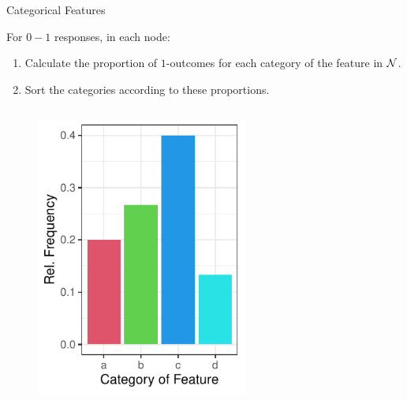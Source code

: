 \documentclass[11pt,compress,t,notes=noshow, xcolor=table]{beamer}
\begin{document}
  \begin{frame}[noframenumbering]{Categorical Features}

For $0-1$ responses, in each node:
  \begin{enumerate}
  \item Calculate the proportion of $1$-outcomes for each category of the feature in $\mathcal{N}$.
  \item Sort the categories according to these proportions.
  \end{enumerate}
  \begin{columns}
  \begin{column}{0.33\textwidth}
  \begin{figure}
  \includegraphics[width=0.8\textwidth]{figure/categoryplot-binary1.pdf} 
  \end{figure}
  \end{column}
  \begin{column}{0.33\textwidth}
  \begin{figure}

\end{figure}
\end{column}
\end{columns}
\end{frame}
\end{document}
